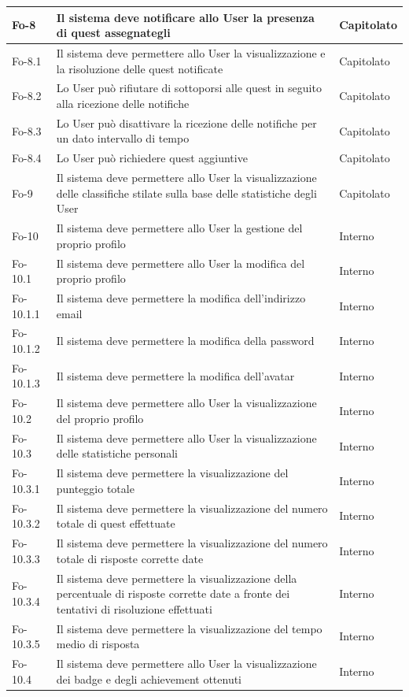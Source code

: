 {{\begin{longtable}{|p{}|p{}|p{}|}
\hline
Fo-8 & Il sistema deve notificare allo User la presenza di quest assegnategli & Capitolato\\
\hline
Fo-8.1 & Il sistema deve permettere allo User la visualizzazione e la risoluzione delle quest notificate & Capitolato\\
\hline
Fo-8.2 & Lo User può rifiutare di sottoporsi alle quest in seguito alla ricezione delle notifiche & Capitolato\\
\hline
Fo-8.3 & Lo User può disattivare la ricezione delle notifiche per un dato intervallo di tempo & Capitolato\\
\hline
Fo-8.4 & Lo User può richiedere quest aggiuntive & Capitolato\\
\hline
Fo-9 & Il sistema deve permettere allo User la visualizzazione delle classifiche stilate sulla base delle statistiche degli User & Capitolato\\
\hline
Fo-10 & Il sistema deve permettere allo User la gestione del proprio profilo & Interno\\
\hline
Fo-10.1 & Il sistema deve permettere allo User la modifica del proprio profilo & Interno\\
\hline
Fo-10.1.1 & Il sistema deve permettere la modifica dell'indirizzo email & Interno\\
\hline
Fo-10.1.2 & Il sistema deve permettere la modifica della password & Interno\\
\hline
Fo-10.1.3 & Il sistema deve permettere la modifica dell'avatar & Interno\\
\hline
Fo-10.2 & Il sistema deve permettere allo User la visualizzazione del proprio profilo & Interno\\
\hline
Fo-10.3 & Il sistema deve permettere allo User la visualizzazione delle statistiche personali & Interno\\
\hline
Fo-10.3.1 & Il sistema deve permettere la visualizzazione del punteggio totale & Interno\\
\hline
Fo-10.3.2 & Il sistema deve permettere la visualizzazione del numero totale di quest effettuate & Interno\\
\hline
Fo-10.3.3 & Il sistema deve permettere la visualizzazione del numero totale di risposte corrette date & Interno\\
\hline
Fo-10.3.4 & Il sistema deve permettere la visualizzazione della percentuale di risposte corrette date a fronte dei tentativi di risoluzione effettuati & Interno\\
\hline
Fo-10.3.5 & Il sistema deve permettere la visualizzazione del tempo medio di risposta & Interno\\
\hline
Fo-10.4 & Il sistema deve permettere allo User la visualizzazione dei badge e degli achievement ottenuti & Interno\\


\end{longtable}}}
